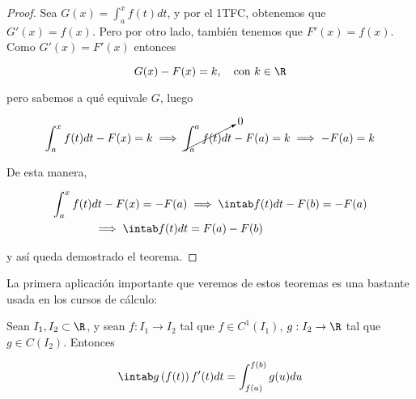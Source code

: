 \begin{proof}
    Sea $G(x) = \int_a^x f(t)dt$, y por el 1TFC, obtenemos que $G'(x) = f(x)$. Pero por otro lado, también tenemos que $F'(x) = f(x)$. Como $G'(x) = F'(x)$ entonces
    
    \[
    G(x) - F(x) = k, \quad \text{con } k \in \R
    \]
    
    \noindent pero sabemos a qué equivale $G$, luego
    
    \[
    \int_a^x f(t)dt - F(x) = k \implies \cancelto{0}{\int_a^af(t)dt} - F(a) = k \implies -F(a) = k
    \]
    
    De esta manera,
    
    \begin{align*}
        \int_a^x f(t)&dt - F(x) = -F(a) \implies \intab f(t)dt - F(b) = -F(a) \\
        &\implies \intab f(t)dt = F(a) - F(b)
    \end{align*}
    
    \noindent y así queda demostrado el teorema.
\end{proof}

La primera aplicación importante que veremos de estos teoremas es una bastante usada en los cursos de cálculo:

\begin{teo}
    Sean $I_1, I_2 \subset \R$, y sean $f: I_1 \rightarrow I_2$ tal que $f \in C^1(I_1)$, $g: I_2 \rightarrow \R$ tal que $g \in C(I_2)$. Entonces
    
    \[
    \intab g\left(f(t)\right)f'(t)dt = \int_{f(a)}^{f(b)} g(u)du
    \]
\end{teo}

